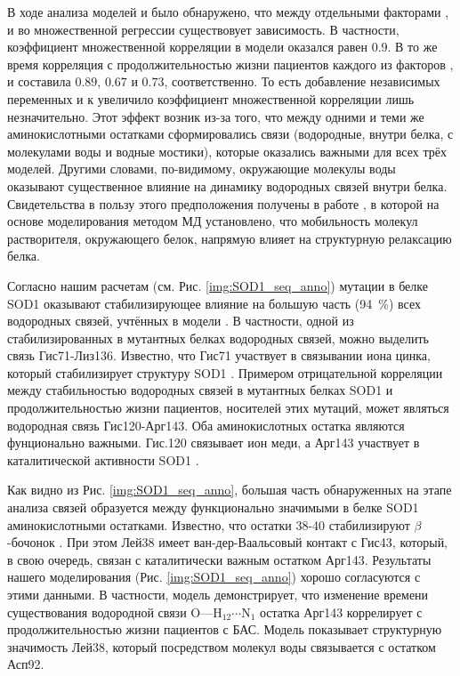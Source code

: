 В ходе анализа моделей \modelCLS{} и \modelCRF{} было обнаружено, что между отдельными факторами \modelpphb{}, \modelpwhb{} и \modelwbr{} во множественной регрессии существовует зависимость. В частности, коэффициент множественной корреляции в модели \modelCLS{} оказался равен 0.9. В то же время корреляция с продолжительностью жизни пациентов каждого из факторов \modelpphb{}, \modelpwhb{} и \modelwbr{} составила $0.89$, $0.67$ и $0.73$, соответственно. То есть добавление независимых переменных \modelpwhb{} и \modelwbr{} к \modelpphb{} увеличило коэффициент множественной корреляции лишь незначительно. Этот эффект возник из-за того, что между одними и теми же аминокислотными остатками сформировались связи (водородные, внутри белка, с молекулами воды и водные мостики), которые оказались важными для всех трёх моделей. Другими словами, по-видимому, окружающие молекулы воды оказывают существенное влияние на динамику водородных связей внутри белка. Свидетельства в пользу этого предположения получены в работе \cite{Tarek2002}, в которой на основе моделирования методом МД установлено, что мобильность молекул растворителя, окружающего белок, напрямую влияет на структурную релаксацию белка. 

Согласно нашим расчетам (см. Рис. \ref{img:SOD1_seq_anno}) мутации в белке SOD1 оказывают стабилизирующее влияние на большую часть (94~\%) всех водородных связей, учтённых в модели \modelpphb{}. В частности, одной из стабилизированных в мутантных белках водородных связей, можно выделить связь Гис71-Лиз136. Известно, что Гис71 участвует в связывании иона цинка, который стабилизирует структуру SOD1 \cite{Arnesano2004,Ding2008}. Примером отрицательной корреляции между стабильностью водородных связей в мутантных белках SOD1 и продолжительностью жизни пациентов, носителей этих мутаций, может являться водородная связь Гис120-Арг143. Оба аминокислотных остатка являются фунционально важными. Гис.120 связывает ион меди, а Арг143 участвует в каталитической активности SOD1 \cite{Muneeswaran2014}.

Как видно из Рис. \ref{img:SOD1_seq_anno}, большая часть обнаруженных на этапе анализа связей образуется между функционально значимыми в белке SOD1 аминокислотными остатками. Известно, что остатки 38-40 стабилизируют $\beta$-бочонок \cite{Deng1995}. При этом Лей38 имеет ван-дер-Ваальсовый контакт с Гис43, который, в свою очередь, связан с каталитически важным остатком Арг143. Результаты нашего моделирования (Рис. \ref{img:SOD1_seq_anno}) хорошо согласуются с этими данными. В частности, модель \modelpphb{} демонстрирует, что изменение времени существования водородной связи $\text{O---}\text{H}_{12}\cdots\text{N}_1$ остатка Арг143 коррелирует с продолжительностью жизни пациентов с БАС. Модель \modelwbr{} показывает структурную значимость Лей38, который посредством молекул воды связывается с остатком Асп92.

